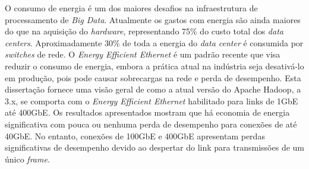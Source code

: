 \begin{resumo}

O consumo de energia é um dos maiores desafios na infraestrutura de processamento de \emph{Big Data}. Atualmente os gastos com energia são ainda maiores do que na aquisição do \emph{hardware}, representando 75\% do custo total dos \emph{data centers}. Aproximadamente 30\% de toda a energia do \emph{data center} é consumida por \emph{switches} de rede. O \emph{Energy Efficient Ethernet} é um padrão recente que visa reduzir o consumo de energia, embora a prática atual na indústria seja desativá-lo em produção, pois pode causar sobrecargas na rede e perda de desempenho. Esta dissertação fornece uma visão geral de como a atual versão do Apache Hadoop, a 3.x, se comporta com o \emph{Energy Efficient Ethernet} habilitado para links de 1GbE até 400GbE. Os resultados apresentados mostram que há economia de energia significativa com pouca ou nenhuma perda de desempenho para conexões de até 40GbE. No entanto, conexões de 100GbE e 400GbE apresentam perdas significativas de desempenho devido ao despertar do link para transmissões de um único \emph{frame}.




\end{resumo}